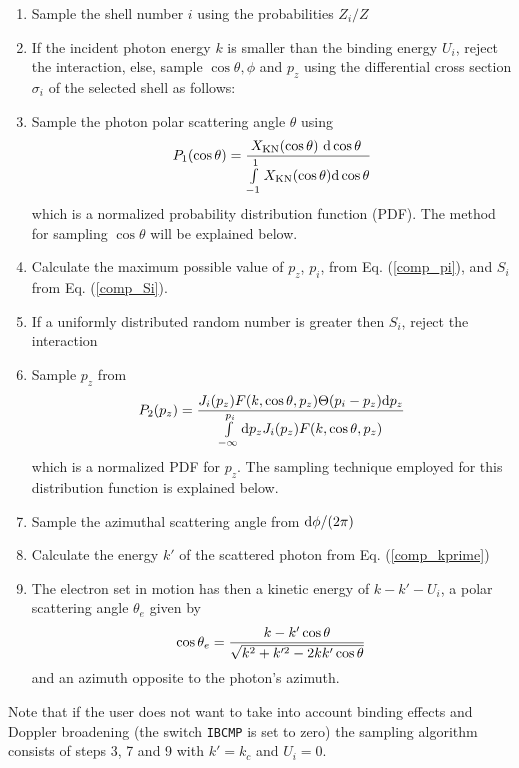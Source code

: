 \begin{enumerate}
\item
Sample the shell number $i$ using the probabilities $Z_i/Z$
\item
If the incident photon energy $k$ is smaller than the binding
energy $U_i$, reject the interaction,
else, sample $\cos \theta, \phi$ and $p_z$ using the differential
cross section $\sigma_i$ of the selected shell as follows:
\item
Sample the photon polar scattering angle $\theta$ using
\begin{displaymath}
P_1(\cos \theta) =
{X_{\rm KN}(\cos \theta)~{\rm d} \cos \theta~ \over
\int\limits_{-1}^1 X_{\rm KN}(\cos \theta) {\rm d} \cos \theta }
\end{displaymath}
which is a normalized probability distribution function (PDF). The method
for sampling $\cos \theta$ will be explained below.
\item
Calculate the maximum possible value of $p_z$, $p_i$, from
Eq. (\ref{comp_pi}), and $S_i$ from Eq. (\ref{comp_Si}).
\item
If a uniformly distributed random number is greater then $S_i$,
reject the interaction
\item
Sample $p_z$ from
\begin{displaymath}
P_2(p_z) =
{ J_i(p_z) F(k,\cos \theta,p_z) \Theta(p_i - p_z) {\rm d} p_z \over
\int\limits_{-\infty}^{p_i} {\rm d} p_z J_i(p_z) F(k,\cos \theta,p_z) }
\end{displaymath}
which is a normalized PDF for $p_z$. The sampling
technique employed for this distribution function is explained below.
\item
Sample the azimuthal scattering angle from ${\rm d}\phi/(2 \pi)$
\item
Calculate the energy $k'$ of the scattered photon from
Eq. (\ref{comp_kprime})
\item
The electron set in motion has then a kinetic energy of $k - k' - U_i$,
a polar scattering angle $\theta_e$ given by
\begin{equation}
\cos \theta_e = {k - k' \cos \theta \over
\sqrt{k^2 + k^{\prime 2} - 2 k k' \cos \theta} }
\end{equation}
and an azimuth opposite to the photon's azimuth.
\end{enumerate}
Note that if the user does not want to take into account binding
effects and Doppler broadening (the switch {\tt IBCMP} is set to zero)
the sampling algorithm consists of steps 3, 7 and 9 with
$k' = k_c$ and $U_i = 0$.

